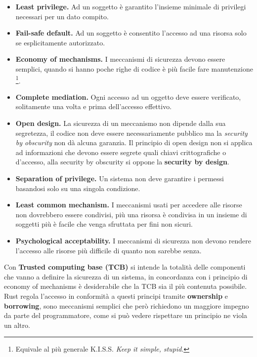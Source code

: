 \documentclass[Lau,binding=0.6cm]{sapthesis}
\begin{document}
\begin{itemize}
	\item \textbf{Least privilege.} Ad un soggetto è garantito l'insieme minimale di privilegi necessari per un dato compito.
	\item \textbf{Fail-safe default.} Ad un soggetto è consentito l'accesso ad una risorsa solo se esplicitamente autorizzato.
	\item \textbf{Economy of mechanisms.} I meccanismi di sicurezza devono essere semplici, quando si hanno poche righe di codice è più facile fare manutenzione \footnote{Equivale al più generale K.I.S.S. \textit{Keep it simple, stupid}.}.
	\item \textbf{Complete mediation.} Ogni accesso ad un oggetto deve essere verificato, solitamente una volta e prima dell'accesso effettivo.
	\item \textbf{Open design.} La sicurezza di un meccanismo non dipende dalla sua segretezza, il codice non deve essere necessariamente pubblico ma la \textit{security by obscurity} non dà alcuna garanzia.
		Il principio di open design non si applica ad informazioni che devono essere segrete quali chiavi crittografiche o d'accesso, alla security by obscurity si oppone la \textbf{security by design}.
	\item \textbf{Separation of privilege.} Un sistema non deve garantire i permessi basandosi solo su una singola condizione.
	\item \textbf{Least common mechanism.} I meccanismi usati per accedere alle risorse non dovrebbero essere condivisi, più una risorsa è condivisa in un insieme di soggetti più è facile che venga sfruttata per fini non sicuri.
	\item \textbf{Psychological acceptability.} I meccanismi di sicurezza non devono rendere l'accesso alle risorse più difficile di quanto non sarebbe senza.
\end{itemize}

Con \textbf{Trusted computing base (TCB)} si intende la totalità delle componenti che vanno a definire la sicurezza di un sistema, in concordanza con i principio di economy of mechanisms è desiderabile che la TCB sia il più contenuta possibile.
Rust regola l'accesso in conformità a questi principi tramite \textbf{ownership} e \textbf{borrowing}, sono meccanismi semplici che però richiedono un maggiore impegno da parte del programmatore, come si può vedere rispettare un principio ne viola un altro.
\end{document}
